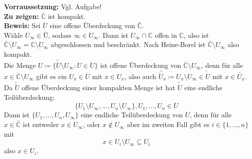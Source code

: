 \begin{problem*}[2]
\textbf{Vorraussetzung:} Vgl. Aufgabe! \\
\textbf{Zu zeigen:} $\bar{\mathbb{C}} $ ist kompakt. \\
\textbf{Beweis:} Sei $\ddot{U}$ eine offene Überdeckung von $\bar{\mathbb{C}} $.\\
Wähle $U_{ \infty } \in Ü$, sodass $\infty \in U_{ \infty }$. Dann ist $U_{ \infty } \cap \mathbb{C}$ offen in $\mathbb{C}$, also ist $\bar{\mathbb{C}} \setminus U_{ \infty } = \mathbb{C} \setminus U_{ \infty } $ abgeschlossen und beschränkt. Nach Heine-Borel ist $\bar{\mathbb{C}} \setminus U_{ \infty }$ also kompakt. \\
Die Menge $U \coloneqq \{ \tilde{ \ddot{U} } \setminus U_{ \infty } : U \in \ddot{U} \}$ ist offene Überdeckung von $\bar{\mathbb{C}} \setminus U_{ \infty }$, denn für alle $ x \in \bar{\mathbb{C}} \setminus U_{ \infty } $ gibt es ein $U_x \in \ddot{U}$ mit $x \in U_x$, also auch $\tilde{ \ddot{U}_x } \coloneqq U_x \setminus U_{ \infty } \in \tilde{ \ddot{U} }$ mit $x \in \tilde{ U_x }.$\\
Da $\tilde{\ddot{U}}$ offene Überdeckung einer kompakten Menge ist hat $\tilde{ \ddot{U} }$ eine endliche Teilüberdeckung: 
\begin{equation*}
  \{ U_1 \setminus U_{ \infty }, \dots, U_n \setminus U_{ \infty } \}, U_1, \dots, U_n \in \ddot{U}
\end{equation*}
Dann ist $\{ U_1, \dots, U_n, U_{ \infty } \}$ eine endliche Teilüberdeckung von $ \ddot{U} $, denn für alle
$x \in \bar{\mathbb{C}} $ ist entweder $ x \in U_{ \infty }$, oder $ x \notin U_{ \infty }$ aber im zweiten Fall gibt es $i \in \{ 1, \dots, n \}$ mit 
\begin{equation*}
  x \in U_i \setminus U_{ \infty } \subseteq U_i
\end{equation*} 
also $x \in U_i$.
\end{problem*}
